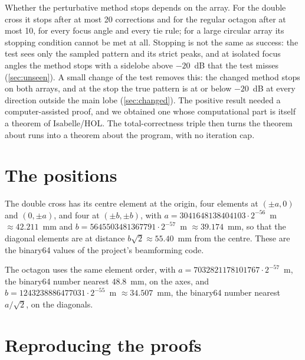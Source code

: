 \documentclass[11pt]{amsart}
\theoremstyle{plain}
\theoremstyle{definition}
\newcommand{\thy}[1]{\texttt{#1}}
\begin{document}
Whether the perturbative method stops depends on the array.  For the double cross it stops after at
most 20 corrections and for the regular octagon after at most 10, for every focus angle and every tie
rule; for a large circular array its
stopping condition cannot be met at all.  Stopping is not the same as success: the test sees only
the sampled pattern and its strict peaks, and at isolated focus angles the method stops with a
sidelobe above $-20$~dB that the test misses (\cref{sec:unseen}).  A small change of the test removes
this: the changed method stops on both arrays, and at the stop the true pattern is at or below $-20$~dB
at every direction outside the main lobe (\cref{sec:changed}).  The positive result needed a computer-assisted proof, and
we obtained one whose computational part is itself a theorem of Isabelle/HOL.  The total-correctness
triple then turns the theorem about runs into a theorem about the program, with no iteration cap.

\appendix

\section{The positions}\label{app:positions}

The double cross has its centre element at the origin, four elements at $(\pm a, 0)$ and $(0, \pm a)$,
and four at $(\pm b, \pm b)$, with $a = 3041648138404103 \cdot 2^{-56}$~m $\approx 42.211$~mm and
$b = 5645503481367791 \cdot 2^{-57}$~m $\approx 39.174$~mm, so that the diagonal elements are at
distance $b\sqrt2 \approx 55.40$~mm from the centre.  These are the binary64 values of the project's
beamforming code.



The octagon uses the same element order, with $a = 7032821178101767 \cdot 2^{-57}$~m, the binary64
number nearest $48.8$~mm, on the axes, and $b = 1243238886477031 \cdot 2^{-55}$~m $\approx 34.507$~mm,
the binary64 number nearest $a/\sqrt2$, on the diagonals.



\section{Reproducing the proofs}\label{app:repro}
\end{document}
